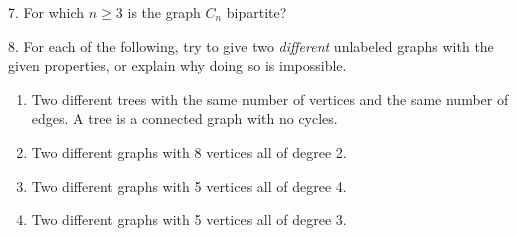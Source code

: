 \documentclass[12pt,]{book}
\theoremstyle{plain}
\theoremstyle{definition}
\theoremstyle{definition}
\theoremstyle{definition}
\numberwithin{equation}{chapter}
\begin{document}
\begin{exerciselist}
{%
}%
\par\smallskip
\item[7.]\hypertarget{exercise-183}{}\hypertarget{p-1609}{}%
For which \(n \ge 3\) is the graph \(C_n\) bipartite?%
\par\smallskip
\item[8.]\hypertarget{exercise-184}{}\hypertarget{p-1610}{}%
For each of the following, try to give two \emph{different} unlabeled graphs with the given properties, or explain why doing so is impossible. \leavevmode%
\begin{enumerate}[label=(\alph*)]
\item\hypertarget{li-723}{}\hypertarget{p-1611}{}%
Two different trees with the same number of vertices and the same number of edges. A tree is a connected graph with no cycles.%
\item\hypertarget{li-724}{}\hypertarget{p-1612}{}%
Two different graphs with 8 vertices all of degree 2.%
\item\hypertarget{li-725}{}\hypertarget{p-1613}{}%
Two different graphs with 5 vertices all of degree 4.%
\item\hypertarget{li-726}{}\hypertarget{p-1614}{}%
Two different graphs with 5 vertices all of degree 3.%
\end{enumerate}
%
\par\smallskip
\end{exerciselist}
\typeout{************************************************}
\typeout{************************************************}
\end{document}
